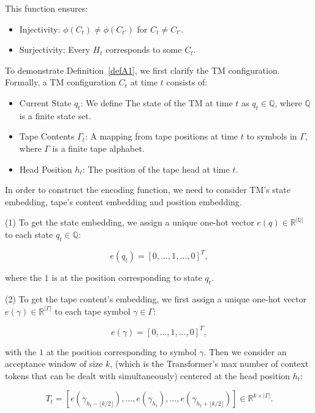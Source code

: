 {%


This function ensures:
\begin{itemize}
    \item {Injectivity}: \( \phi(C_t) \neq \phi(C_{t'}) \) for \( C_t \neq C_{t'} \).
    \item {Surjectivity}: Every \( H_t \) corresponds to some \( C_t \).
\end{itemize}

To demonstrate Definition~\ref{defA1}, we first clarify the TM configuration. Formally, a TM configuration \( C_t \) at time \( t \) consists of:
\begin{itemize}
    \item Current State \( q_t \): We define The state of the TM at time \( t \) as \( q_t \in \mathbb{Q}\), where \(\mathbb{Q}\) is a finite state set.
    \item Tape Contents \( \Gamma_t \): A mapping from tape positions at time \(t\) to symbols in \( \Gamma \), where \(\Gamma\) is a finite tape alphabet.
    \item Head Position \( h_t \): The position of the tape head at time \( t \).
\end{itemize}

In order to construct the encoding function, we need to consider TM's state embedding, tape's content embedding and position embedding.

(1) To get the state embedding, we assign a unique one-hot vector \( e(q) \in \mathbb{R}^{|\mathbb{Q}|} \) to each state \( q_t \in \mathbb{Q} \):

\[
e(q_t) = [0, \dots, 1, \dots, 0]^T,
\]

where the \( 1 \) is at the position corresponding to state \( q_t \).

(2) To get the tape content's embedding, we first assign a unique one-hot vector \( e(\gamma) \in \mathbb{R}^{|\Gamma|} \) to each tape symbol \( \gamma \in \Gamma \):

\[
e(\gamma) = [0, \dots, 1, \dots, 0]^T,
\]

with the \( 1 \) at the position corresponding to symbol \( \gamma \). Then we consider an acceptance window of size \( k \), (which is the Transformer's max number of context tokens that can be dealt with simultaneously) centered at the head position \( h_t \):

\[
T_t = \left[ e(\gamma_{h_t - \lfloor k/2 \rfloor}), \dots, e(\gamma_{h_t}), \dots, e(\gamma_{h_t + \lfloor k/2 \rfloor}) \right] \in \mathbb{R}^{k \times |\Gamma|}.
\]

}
